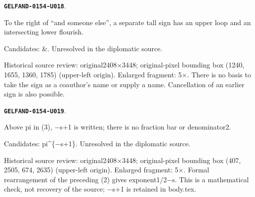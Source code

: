 \documentclass[11pt]{article}
\theoremstyle{definition}
\theoremstyle{remark}
\begin{document}
\par\noindent\leavevmode{}\label{GELFAND-0154-U018}\label{GELFAND-P001419:witten-list-final-sign:note}\textbf{\texttt{GELFAND-0154-U018}}.\nopagebreak[4]\par
To the right of “and someone else”, a separate tall sign has an upper loop and an intersecting lower flourish.\par
Candidates: \&. Unresolved in the diplomatic source.\par
Historical source review: original2408×3448; original-pixel bounding box (1240, 1655, 1360, 1785) (upper-left origin). Enlarged fragment: 5×. There is no basis to take the sign as a coauthor’s name or supply a name. Cancellation of an earlier sign is also possible.\par\medskip
\par\noindent\leavevmode{}\label{GELFAND-0154-U019}\label{GELFAND-P001419:eq3-pi-exponent:note}\textbf{\texttt{GELFAND-0154-U019}}.\nopagebreak[4]\par
Above pi in (3), −s+1 is written; there is no fraction bar or denominator2.\par
Candidates: pi\textasciicircum{}\{−s+1\}. Unresolved in the diplomatic source.\par
Historical source review: original2408×3448; original-pixel bounding box (407, 2505, 674, 2635) (upper-left origin). Enlarged fragment: 5×. Formal rearrangement of the preceding (2) gives exponent1/2−s. This is a mathematical check, not recovery of the source; −s+1 is retained in body.tex.\par\medskip
\end{document}
